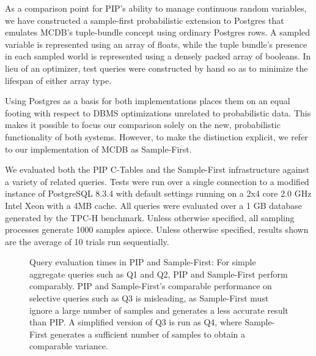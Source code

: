 As a comparison point for PIP's ability to manage continuous random variables, we have constructed a sample-first probabilistic extension to Postgres that emulates MCDB's tuple-bundle concept using ordinary Postgres rows.  A sampled variable is represented using an array of floats, while the tuple bundle's presence in each sampled world is represented using a densely packed array of booleans.  In lieu of an optimizer, test queries were constructed by hand so as to minimize the lifespan of either array type.

Using Postgres as a basis for both implementations places them on an equal footing with respect to DBMS optimizations unrelated to probabilistic data.  This makes it possible to focus our comparison solely on the new, probabilistic functionality of both systems.  However, to make the distinction explicit, we refer to our implementation of MCDB as Sample-First.

We evaluated both the PIP C-Tables and the Sample-First infrastructure against a variety of related queries.  Tests were run over a single connection to a modified instance of PostgreSQL 8.3.4 with default settings running on a 2x4 core 2.0 GHz Intel Xeon with a 4MB cache.  All queries were evaluated over a 1 GB database generated by the TPC-H benchmark.  Unless otherwise specified, all sampling processes generate 1000 samples apiece.  Unless otherwise specified, results shown are the average of 10 trials run sequentially.  

\begin{figure}
\begin{center}
\caption{Query evaluation times in PIP and Sample-First: For simple aggregate queries such as Q1 and Q2, PIP and Sample-First perform comparably.  PIP and Sample-First's comparable performance on selective queries such as Q3 is misleading, as Sample-First must ignore a large number of samples and generates a less accurate result than PIP.  A simplified version of Q3 is run as Q4, where Sample-First generates a sufficient number of samples to obtain a comparable variance.}
\label{fig:querytimings}
\end{center}
\end{figure}

